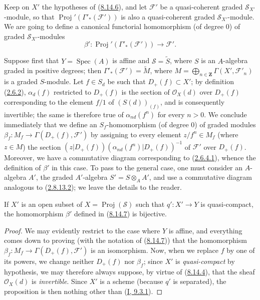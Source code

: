\begin{env}[8.14.7]
\label{II.8.14.7}
Keep on $X'$ the hypotheses of
(\hyperref[II.8.14.6]{8.14.6}), and let $\mathcal{F}'$ be a
quasi-coherent graded $\mathcal{S}_{X'}$-module, so that
$\operatorname{Proj}'(\Gamma'_*(\mathcal{F}'))$ is also a
quasi-coherent graded $\mathcal{S}_{X'}$-module. We are going to define a
canonical functorial homomorphism (of degree $0$) of
graded $\mathcal{S}_{X'}$-modules
\begin{equation}
\label{II.8.14.7.1}
  \beta':\operatorname{Proj}'(\Gamma'_*(\mathcal{F}'))\to\mathcal{F}'.
\tag{8.14.7.1}
\end{equation}

Suppose first that $Y=\operatorname{Spec}(A)$ is affine and
$\mathcal{S}=\widetilde{S}$, where $S$ is an $A$-algebra graded in positive
degrees; then $\Gamma'_*(\mathcal{F}')=\widetilde{M}$, where
$M=\bigoplus_{n\in\mathbf{Z}}\Gamma(X',\mathcal{F}'_n)$ is a graded
$S$-module. Let $f\in S_d$ be such that $D_+(f)\subset X'$; by definition
(\hyperref[II.2.6.2]{2.6.2}), $\alpha_d(f)$ restricted to $D_+(f)$ is the
section of $\mathcal{O}_X(d)$ over $D_+(f)$ corresponding to
the element $f/1$ of $(S(d))_{(f)}$, and is consequently invertible; the
same is therefore true of $\alpha_{nd}(f^n)$ for every $n>0$. We conclude
immediately that we define an $S_f$-homomorphism (of degree $0$) of graded
modules $\beta_f:M_f\to\Gamma(D_+(f),\mathcal{F}')$ by assigning to every
element $z/f^n\in M_f$ (where $z\in M$) the section
$(z|D_+(f))(\alpha_{nd}(f^n)|D_+(f))^{-1}$ of $\mathcal{F}'$ over
$D_+(f)$. Moreover, we have a commutative diagram corresponding to
(\hyperref[II.2.6.4.1]{2.6.4.1}), whence the definition of $\beta'$ in this
case. To pass to the general case, one must consider an $A$-algebra $A'$,
the graded $A'$-algebra $S'=S\otimes_A A'$, and use a commutative diagram
analogous to (\hyperref[II.2.8.13.2]{2.8.13.2}); we leave
the details to the reader.
\end{env}

\begin{proposition}[8.14.8]
\label{II.8.14.8}
If $X'$ is an open subset of $X=\operatorname{Proj}(\mathcal{S})$ such that
$q':X'\to Y$ is quasi-compact, the homomorphism $\beta'$ defined in
(\hyperref[II.8.14.7]{8.14.7}) is bijective.
\end{proposition}

\begin{proof}
We may evidently restrict to the case where $Y$ is affine, and everything
comes down to proving (with the notation of (\hyperref[II.8.14.7]{8.14.7}))
that the homomorphism $\beta_f:M_f\to\Gamma(D_+(f),\mathcal{F}')$ is an
isomorphism. Now, when we replace $f$ by one of its powers, we change neither
$D_+(f)$ nor $\beta_f$; since $X'$ is \emph{quasi-compact} by
hypothesis, we may therefore always suppose, by virtue of
(\hyperref[II.8.14.4]{8.14.4}), that the sheaf $\mathcal{O}_X(d)$ is
\emph{invertible}. Since $X'$ is a scheme (because $q'$ is separated), the
proposition is then nothing other than (\hyperref[I.9.3.1]{I, 9.3.1}).
\end{proof}

